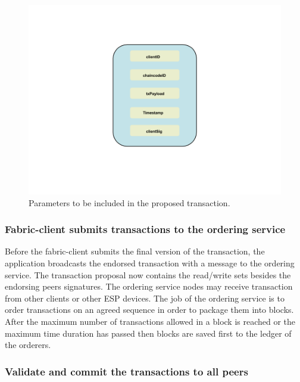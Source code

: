 \begin{figure}[!htb]
    \centering
    \includegraphics[width=1\textwidth]{figures/endorsejson.png}
    \caption{Parameters to be included in the proposed transaction.}
    \label{fig:endorsejson}
\end{figure}


\subsubsection{Fabric-client submits transactions to the ordering service}

Before the fabric-client submits the final version of the transaction, the application broadcasts the endorsed transaction with a message to the ordering service.
The transaction proposal now contains the read/write sets besides the endorsing peers signatures. 
The ordering service nodes may receive transaction from other clients or other ESP devices. The job of the ordering service is to order transactions on an agreed sequence in order to package them into blocks. After the maximum number of transactions allowed in a block is reached or the maximum time duration has passed then blocks are saved first to the ledger of the orderers. 


\subsubsection{Validate and commit the transactions to all peers}

